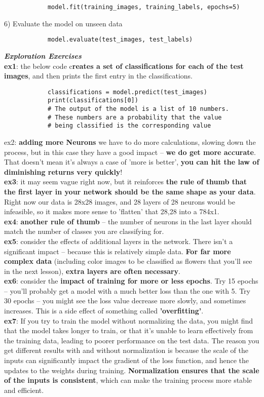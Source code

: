 \documentclass[20pt]{article}
\begin{document}
\begin{itemize}
\begin{verbatim}
			model.fit(training_images, training_labels, epochs=5)
		\end{verbatim}
		6) Evaluate the model on unseen data
		\begin{verbatim}
			model.evaluate(test_images, test_labels)
		\end{verbatim}
		\textit{\textbf{Exploration Exercises}}\\
		\textbf{ex1}: the below code c\textbf{reates a set of classifications for each of the test images}, and then prints the first entry in the classifications.
		\begin{verbatim}
			classifications = model.predict(test_images)
			print(classifications[0])
			# The output of the model is a list of 10 numbers.
			# These numbers are a probability that the value
			# being classified is the corresponding value
		\end{verbatim}
		ex2\textbf{}: \textbf{adding more Neurons} we have to do more calculations, slowing down the process, but in this case they have a good impact -- \textbf{we do get more accurate}. That doesn't mean it's always a case of 'more is better', \textbf{you can hit the law of diminishing returns very quickly}!\\
		\textbf{ex3}: it may seem vague right now, but it reinforces \textbf{the rule of thumb that the first layer in your network should be the same shape as your data}. Right now our data is 28x28 images, and 28 layers of 28 neurons would be infeasible, so it makes more sense to 'flatten' that 28,28 into a 784x1.\\
		\textbf{ex4}: \textbf{another rule of thumb} -- the number of neurons in the last layer should match the number of classes you are classifying for.\\
		\textbf{ex5}: consider the effects of additional layers in the network. There isn't a significant impact -- because this is relatively simple data. \textbf{For far more complex data} (including color images to be classified as flowers that you'll see in the next lesson),\textbf{ extra layers are often necessary}.\\
		\textbf{ex6}: consider the \textbf{impact of training for more or less epochs}. Try 15 epochs -- you'll probably get a model with a much better loss than the one with 5. Try 30 epochs -- you might see the loss value decrease more slowly, and sometimes increases. This is a side effect of something called \textbf{'overfitting'}.\\
		\textbf{ex7}: If you try to train the model without normalizing the data, you might find that the model takes longer to train, or that it's unable to learn effectively from the training data, leading to poorer performance on the test data. The reason you get different results with and without normalization is because the scale of the inputs can significantly impact the gradient of the loss function, and hence the updates to the weights during training. \textbf{Normalization ensures that the scale of the inputs is consistent}, which can make the training process more stable and efficient.

\end{itemize}
\end{document}
